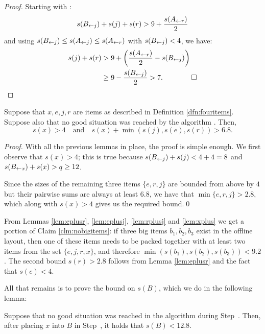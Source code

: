 \begin{proof} %
Starting with :
\[ s(B_{\leftarrow j}) + s(j) + s(r) > 9 + \frac{s(A_{\leftarrow r})}{2}  \]
and using $s(B_{\leftarrow j})\le s(A_{\leftarrow j})\le s(A_{\leftarrow r})$ with $s(B_{\leftarrow j}) < 4$, we have:
\begin{align*}
s(j) + s(r) &> 9 + \left( \frac{s(A_{\leftarrow r})}{2} - s(B_{\leftarrow j}) \right) \\
            & \ge  9 - \frac{s(B_{\leftarrow j})}{2} > 7. \qquad \qed 
\end{align*}
\end{proof}

\begin{lem}\label{lem:xplus}
Suppose that $x,e,j,r$ are items as described in Definition \ref{dfn:fouritems}.
Suppose also that no good situation was reached by the algorithm \tbalg.
Then,
\[ s(x) > 4 \quad \text{and} \quad s(x) + \min(s(j),s(e),s(r)) > 6.8. \]
\end{lem}

\begin{proof}
With all the previous lemmas in place, the proof is simple enough. We first
observe that $s(x) > 4$; this is true because $s(B_{\leftarrow j}) + s(j) < 4+4 = 8$ and
$s(B_{\leftarrow x}) + s(x) > q \geq 12$.

Since the sizes of the remaining three items $\{e,r,j\}$ are bounded from above
by $4$ but their pairwise sums are always at least $6.8$, we have
that $\min\{e,r,j\} > 2.8$, which along with $s(x) > 4$ gives us the
required bound.\qed
\end{proof}

From Lemmas \ref{lem:eplusr}, \ref{lem:eplusj}, \ref{lem:rplusj} and
\ref{lem:xplus} we get a portion of Claim \ref{clm:nobigitems}: if
three big items $b_1, b_2, b_3$ exist in the offline layout, then one of these
items needs to be packed together with at least two items from the set
$\{e,j,r,x\}$, and therefore $\min(s(b_1),s(b_2),s(b_3)) < 9.2$. The
second bound $s(r) > 2.8$ follows from Lemma \ref{lem:eplusr} and the
fact that $s(e) < 4$.

All that remains is to prove the bound on $s(B)$, which we do in the following lemma:

\begin{lem}\label{lem:boundonB}
Suppose that no good situation was reached in the algorithm \tbalg during Step~{\rm {}}.
Then, after pla\-cing $x$ into $B$ in Step~{\rm {}}, it holds that $s(B) < 12.8$.
\end{lem}

